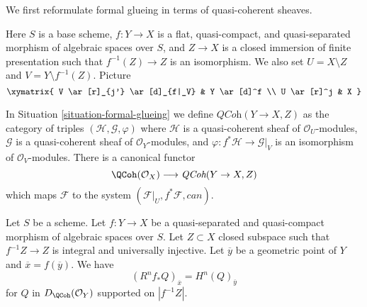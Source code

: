 \medskip\noindent
We first reformulate formal glueing in
terms of quasi-coherent sheaves.

\begin{situation}
\label{situation-formal-glueing}
Here $S$ is a base scheme, $f : Y \to X$ is a flat, quasi-compact,
and quasi-separated morphism of algebraic spaces over $S$, and
$Z \to X$ is a closed immersion of finite presentation such that
$f^{-1}(Z) \to Z$ is an isomorphism.
We also set $U = X \setminus Z$ and $V = Y \setminus f^{-1}(Z)$.
Picture
$$
\xymatrix{
V \ar[r]_{j'} \ar[d]_{f|_V} & Y \ar[d]^f \\
U \ar[r]^j & X
}
$$
\end{situation}

\noindent
In Situation \ref{situation-formal-glueing} we define
$\textit{QCoh}(Y \to X, Z)$ as the category of
triples $(\mathcal{H}, \mathcal{G}, \varphi)$ where
$\mathcal{H}$ is a quasi-coherent sheaf of
$\mathcal{O}_U$-modules, $\mathcal{G}$ is a quasi-coherent sheaf
of $\mathcal{O}_Y$-modules, and
$\varphi : f^*\mathcal{H} \to \mathcal{G}|_V$ is an isomorphism
of $\mathcal{O}_V$-modules. There is a canonical
functor
\begin{equation}
\label{equation-formal-glueing-modules}
\QCoh(\mathcal{O}_X) \longrightarrow \textit{QCoh}(Y \to X, Z)
\end{equation}
which maps $\mathcal{F}$ to the system
$(\mathcal{F}|_U, f^*\mathcal{F}, can)$.

\begin{lemma}
\label{lemma-stalk-pushforward-with-support}
Let $S$ be a scheme. Let $f : Y \to X$ be a quasi-separated and
quasi-compact morphism of algebraic spaces over $S$. Let $Z \subset X$
closed subspace such that $f^{-1}Z \to Z$ is integral and universally
injective. Let $\overline{y}$ be a geometric point of $Y$ and
$\overline{x} = f(\overline{y})$. We have
$$
(R^nf_*Q)_{\overline{x}} = H^n(Q)_{\overline{y}}
$$
for $Q$ in $D_\QCoh(\mathcal{O}_Y)$ supported on $|f^{-1}Z|$.
\end{lemma}

